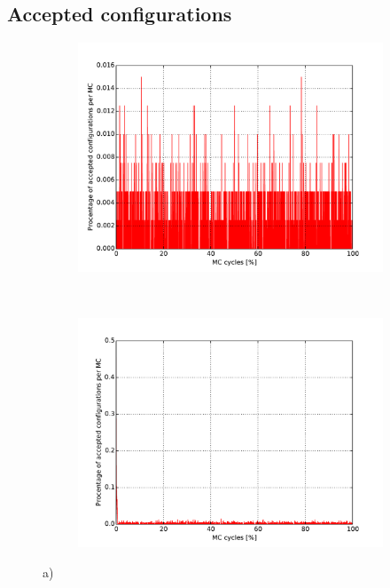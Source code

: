 \subsection{Accepted configurations}

\begin{figure}[H]
    \centering
    \begin{subfigure}{0.5\textwidth}
        \centering
        \includegraphics[width=\linewidth]{result/bilder/config/energy22-MC1000000T1-configN20}
        \caption{}
    \end{subfigure}%
    ~ 
    \begin{subfigure}{0.5\textwidth}
        \centering
        \includegraphics[width=\linewidth]{result/bilder/config/energy22-MC1000000T1-config-RNGN20}
        \caption{}
    \end{subfigure}
    \caption{a) }
    \label{fig:config-T1}
\end{figure}

